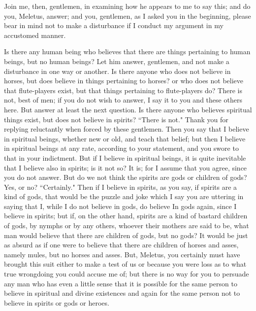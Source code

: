 \documentclass[letterpaper,12pt]{article}
\newcommand{\stephpag}[1]{\marginnote{\small\itshape\fontfamily{ppl}\selectfont #1}}
\begin{document}
Join me, then, gentlemen, in examining how he appears to me to say this; and do you, Meletus, answer; \stephpag{b} and you, gentlemen, as I asked you in the beginning, please bear in mind not to make a disturbance if I conduct my argument in my accustomed manner.

Is there any human being who believes that there are things pertaining to human beings, but no human beings? Let him answer, gentlemen, and not make a disturbance in one way or another. Is there anyone who does not believe in horses, but does believe in things pertaining to horses? or who does not believe that flute-players exist, but that things pertaining to flute-players do? There is not, best of men; if you do not wish to answer, I say it to you and these others here. But answer at least \stephpag{c} the next question. Is there anyone who believes spiritual things exist, but does not believe in spirits? ``There is not." Thank you for replying reluctantly when forced by these gentlemen. Then you say that I believe in spiritual beings, whether new or old, and teach that belief; but then I believe in spiritual beings at any rate, according to your statement, and you swore to that in your indictment. But if I believe in spiritual beings, it is quite inevitable that I believe also in spirits; is it not so? It is; for I assume that you agree, since you do not answer. But do we not think the spirits are \stephpag{d} gods or children of gods? Yes, or no? ``Certainly." Then if I believe in spirits, as you say, if spirits are a kind of gods, that would be the puzzle and joke which I say you are uttering in saying that I, while I do not believe in gods, do believe In gods again, since I believe in spirits; but if, on the other hand, spirits are a kind of bastard children of gods, by nymphs or by any others, whoever their mothers are said to be, what man would believe that there are children of gods, but no gods? It would be just as absurd \stephpag{e} as if one were to believe that there are children of horses and asses, namely mules, but no horses and asses. But, Meletus, you certainly must have brought this suit either to make a test of us or because you were loss as to what true wrongdoing you could accuse me of; but there is no way for you to persuade any man who has even a little sense that it is possible for the same person to believe in spiritual and divine existences and again for the same person not to believe in spirits or gods or \stephpag{28 a} heroes.
\end{document}
